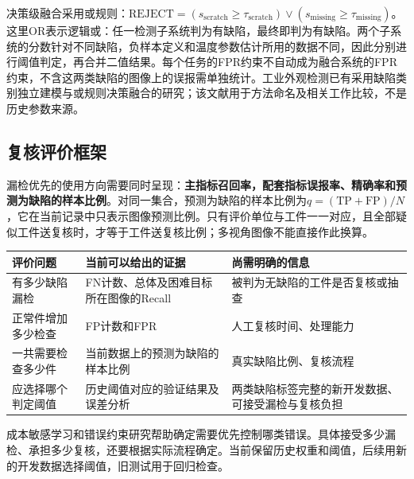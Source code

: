 决策级融合采用或规则：$\mathrm{REJECT}=(s_{\mathrm{scratch}}\geq\tau_{\mathrm{scratch}})\lor(s_{\mathrm{missing}}\geq\tau_{\mathrm{missing}})$。这里OR表示逻辑或：任一检测子系统判为有缺陷，最终即判为有缺陷。两个子系统的分数针对不同缺陷，负样本定义和温度参数估计所用的数据不同，因此分别进行阈值判定，再合并二值结果。每个任务的FPR约束不自动成为融合系统的FPR约束，不含这两类缺陷的图像上的误报需单独统计。工业外观检测已有采用缺陷类别独立建模与或规则决策融合的研究\cite{ref15}；该文献用于方法命名及相关工作比较，不是历史参数来源。

\FloatBarrier{}\subsection{复核评价框架}
漏检优先的使用方向需要同时呈现：\textbf{主指标召回率，配套指标误报率、精确率和预测为缺陷的样本比例}。对同一集合，预测为缺陷的样本比例为$q=(\mathrm{TP}+\mathrm{FP})/N$，它在当前记录中只表示图像预测比例。只有评价单位与工件一一对应，且全部疑似工件送复核时，才等于工件送复核比例；多视角图像不能直接作此换算。


\par\medskip\noindent\begin{minipage}{\linewidth}\small{}
\begin{tabular}{@{}>{\raggedright\arraybackslash}p{0.240\dimexpr\linewidth-4\tabcolsep\relax}>{\raggedright\arraybackslash}p{0.340\dimexpr\linewidth-4\tabcolsep\relax}>{\raggedright\arraybackslash}p{0.420\dimexpr\linewidth-4\tabcolsep\relax}@{}}
\toprule
评价问题 & 当前可以给出的证据 & 尚需明确的信息 \\
\midrule
有多少缺陷漏检 & FN计数、总体及困难目标所在图像的Recall & 被判为无缺陷的工件是否复核或抽查 \\
正常件增加多少检查 & FP计数和FPR & 人工复核时间、处理能力 \\
一共需要检查多少件 & 当前数据上的预测为缺陷的样本比例 & 真实缺陷比例、复核流程 \\
应选择哪个判定阈值 & 历史阈值对应的验证结果及误差分析 & 两类缺陷标签完整的新开发数据、可接受漏检与复核负担 \\
\bottomrule\end{tabular}\end{minipage}\par\medskip

成本敏感学习和错误约束研究\cite{ref5}\cite{ref6}帮助确定需要优先控制哪类错误。具体接受多少漏检、承担多少复核，还要根据实际流程确定。当前保留历史权重和阈值，后续用新的开发数据选择阈值，旧测试用于回归检查。

